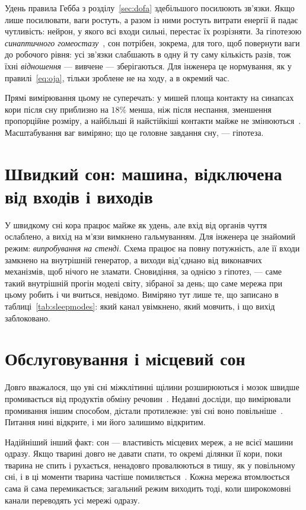 Удень правила Гебба з розділу~\ref{sec:dofa} здебільшого посилюють зв'язки. Якщо лише посилювати, ваги ростуть, а разом із ними ростуть витрати енергії й падає чутливість: нейрон, у якого всі входи сильні, перестає їх розрізняти. За гіпотезою \emph{синаптичного гомеостазу}~\cite{TononiCirelli2014}, сон потрібен, зокрема, для того, щоб повернути ваги до робочого рівня: усі зв'язки слабшають в одну й ту саму кількість разів, тож їхні \emph{відношення} --- вивчене --- зберігаються. Для інженера це нормування, як у правилі~\eqref{eq:oja}, тільки зроблене не на ходу, а в окремий час.

Прямі вимірювання цьому не суперечать: у мишей площа контакту на синапсах кори після сну приблизно на $18\%$ менша, ніж після неспання, зменшення пропорційне розміру, а найбільші й найстійкіші контакти майже не змінюються~\cite{deVivo2017}. Масштабування ваг виміряно; що це головне завдання сну, --- гіпотеза.

\section{Швидкий сон: машина, відключена від входів і виходів}

У швидкому сні кора працює майже як удень, але вхід від органів чуття ослаблено, а вихід на м'язи вимкнено гальмуванням. Для інженера це знайомий режим: \emph{випробування на стенді}. Схема працює на повну потужність, але її входи замкнено на внутрішній генератор, а виходи від'єднано від виконавчих механізмів, щоб нічого не зламати. Сновидіння, за однією з гіпотез, --- саме такий внутрішній прогін моделі світу, зібраної за день; що саме мережа при цьому робить і чи вчиться, невідомо. Виміряно тут лише те, що записано в таблиці~\ref{tab:sleepmodes}: який канал увімкнено, який мовчить, і що вихід заблоковано.

\section{Обслуговування і місцевий сон}

Довго вважалося, що уві сні міжклітинні щілини розширюються і мозок швидше промивається від продуктів обміну речовин~\cite{Xie2013}. Недавні досліди, що вимірювали промивання іншим способом, дістали протилежне: уві сні воно повільніше~\cite{Miao2024}. Питання нині відкрите, і ми його залишимо відкритим.

Надійніший інший факт: сон --- властивість місцевих мереж, а не всієї машини одразу. Якщо тварині довго не давати спати, то окремі ділянки її кори, поки тварина не спить і рухається, ненадовго провалюються в тишу, як у повільному сні, і в ці моменти тварина частіше помиляється~\cite{Vyazovskiy2011}. Кожна мережа втомлюється сама й сама перемикається; загальний режим виходить тоді, коли широкомовні канали переводять усі мережі одразу.

